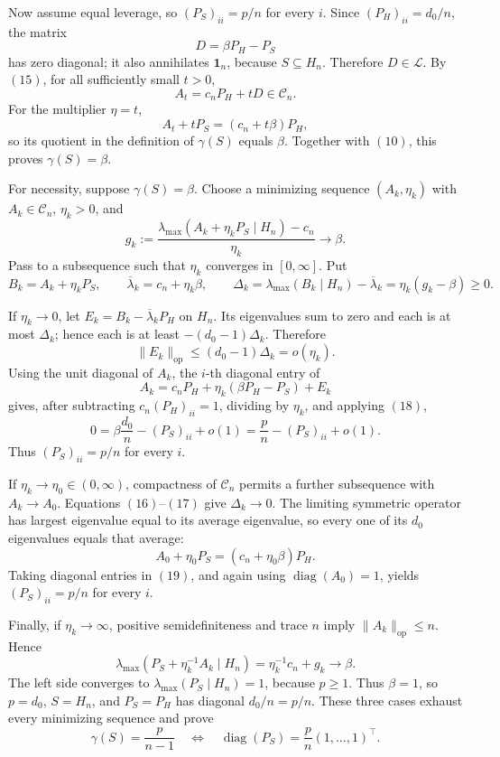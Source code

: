 Now assume equal leverage, so \((P_S)_{ii}=p/n\) for every \(i\). Since \((P_H)_{ii}=d_0/n\), the matrix
\[
D=\beta P_H-P_S
\]
has zero diagonal; it also annihilates \(\mathbf1_n\), because \(S\subseteq H_n\). Therefore \(D\in\mathcal L\). By \((15)\), for all sufficiently small \(t>0\),
\[
A_t=c_nP_H+tD\in\mathcal C_n.
\]
For the multiplier \(\eta=t\),
\[
A_t+tP_S=(c_n+t\beta)P_H,
\]
so its quotient in the definition of \(\gamma(S)\) equals \(\beta\). Together with \((10)\), this proves \(\gamma(S)=\beta\).

For necessity, suppose \(\gamma(S)=\beta\). Choose a minimizing sequence \((A_k,\eta_k)\) with \(A_k\in\mathcal C_n\), \(\eta_k>0\), and
\[
g_k:=\frac{\lambda_{\max}(A_k+\eta_kP_S\mid H_n)-c_n}{\eta_k}
\longrightarrow\beta.
\tag{16}
\]
Pass to a subsequence such that \(\eta_k\) converges in \([0,\infty]\). Put
\[
B_k=A_k+\eta_kP_S,
\qquad
\overline\lambda_k=c_n+\eta_k\beta,
\qquad
\Delta_k=\lambda_{\max}(B_k\mid H_n)-\overline\lambda_k
=\eta_k(g_k-\beta)\geq0.
\tag{17}
\]

If \(\eta_k\to0\), let \(E_k=B_k-\overline\lambda_kP_H\) on \(H_n\). Its eigenvalues sum to zero and each is at most \(\Delta_k\); hence each is at least \(-(d_0-1)\Delta_k\). Therefore
\[
\|E_k\|_{\mathrm{op}}\leq(d_0-1)\Delta_k=o(\eta_k).
\tag{18}
\]
Using the unit diagonal of \(A_k\), the \(i\)-th diagonal entry of
\[
A_k=c_nP_H+\eta_k(\beta P_H-P_S)+E_k
\]
gives, after subtracting \(c_n(P_H)_{ii}=1\), dividing by \(\eta_k\), and applying \((18)\),
\[
0=\beta\frac{d_0}{n}-(P_S)_{ii}+o(1)
=\frac pn-(P_S)_{ii}+o(1).
\]
Thus \((P_S)_{ii}=p/n\) for every \(i\).

If \(\eta_k\to\eta_0\in(0,\infty)\), compactness of \(\mathcal C_n\) permits a further subsequence with \(A_k\to A_0\). Equations \((16)\)--\((17)\) give \(\Delta_k\to0\). The limiting symmetric operator has largest eigenvalue equal to its average eigenvalue, so every one of its \(d_0\) eigenvalues equals that average:
\[
A_0+\eta_0P_S=(c_n+\eta_0\beta)P_H.
\tag{19}
\]
Taking diagonal entries in \((19)\), and again using \(\operatorname{diag}(A_0)=1\), yields \((P_S)_{ii}=p/n\) for every \(i\).

Finally, if \(\eta_k\to\infty\), positive semidefiniteness and trace \(n\) imply \(\|A_k\|_{\mathrm{op}}\leq n\). Hence
\[
\lambda_{\max}\!\left(P_S+\eta_k^{-1}A_k\mid H_n\right)
=\eta_k^{-1}c_n+g_k
\longrightarrow\beta.
\]
The left side converges to \(\lambda_{\max}(P_S\mid H_n)=1\), because \(p\geq1\). Thus \(\beta=1\), so \(p=d_0\), \(S=H_n\), and \(P_S=P_H\) has diagonal \(d_0/n=p/n\). These three cases exhaust every minimizing sequence and prove
\[
\gamma(S)=\frac{p}{n-1}
\quad\Longleftrightarrow\quad
\operatorname{diag}(P_S)=\frac pn(1,\ldots,1)^\top.
\tag{20}
\]

